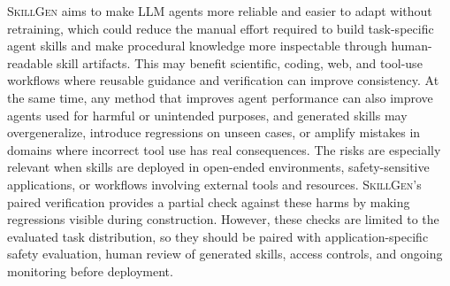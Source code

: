 \documentclass{article}
\begin{document}
\textsc{SkillGen} aims to make LLM agents more reliable and easier to adapt without retraining, which could reduce the manual effort required to build task-specific agent skills and make procedural knowledge more inspectable through human-readable skill artifacts. This may benefit scientific, coding, web, and tool-use workflows where reusable guidance and verification can improve consistency. At the same time, any method that improves agent performance can also improve agents used for harmful or unintended purposes, and generated skills may overgeneralize, introduce regressions on unseen cases, or amplify mistakes in domains where incorrect tool use has real consequences. The risks are especially relevant when skills are deployed in open-ended environments, safety-sensitive applications, or workflows involving external tools and resources. \textsc{SkillGen}'s paired verification provides a partial check against these harms by making regressions visible during construction. However, these checks are limited to the evaluated task distribution, so they should be paired with application-specific safety evaluation, human review of generated skills, access controls, and ongoing monitoring before deployment.
\end{document}
